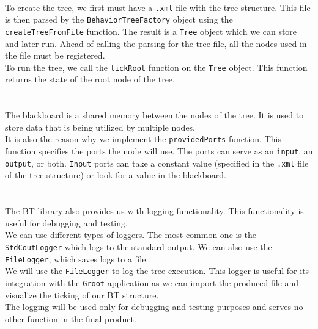         \\
            To create the tree, we first must have a \texttt{.xml} file with the tree structure. This file is then parsed by the \texttt{BehaviorTreeFactory} object using the \texttt{createTreeFromFile} function. The result is a \texttt{Tree} object which we can store and later run. Ahead of calling the parsing for the tree file, all the nodes used in the file must be registered.\\
            To run the tree, we call the \texttt{tickRoot} function on the \texttt{Tree} object. This function returns the state of the root node of the tree.\\\\
        \\
            The blackboard is a shared memory between the nodes of the tree. It is used to store data that is being utilized by multiple nodes.\\
            It is also the reason why we implement the \texttt{providedPorts} function. This function specifies the ports the node will use. The ports can serve as an \texttt{input}, an \texttt{output}, or both. \texttt{Input} ports can take a constant value (specified in the \texttt{.xml} file of the tree structure) or look for a value in the blackboard.\\\\
        \\
            The BT library also provides us with logging functionality. This functionality is useful for debugging and testing.\\
            We can use different types of loggers. The most common one is the \texttt{StdCoutLogger} which logs to the standard output. We can also use the \texttt{FileLogger}, which saves logs to a file.\\
            We will use the \texttt{FileLogger} to log the tree execution. This logger is useful for its integration with the \texttt{Groot} application as we can import the produced file and visualize the ticking of our BT structure.\\
            The logging will be used only for debugging and testing purposes and serves no other function in the final product.
